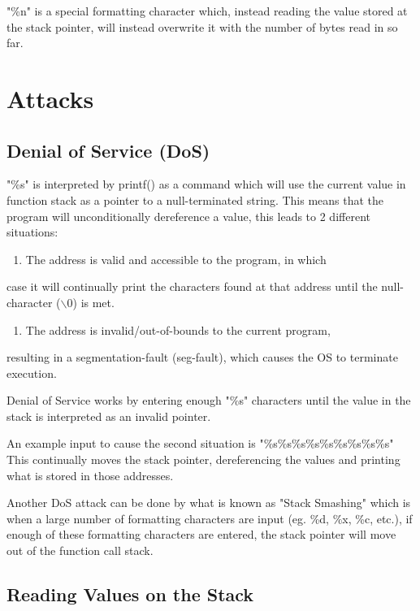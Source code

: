 \documentclass[11pt]{article}
\begin{document}
"\%n" is a special formatting character which, instead reading the
value stored at the stack pointer, will instead overwrite it with the
number of bytes read in so far.

\section{Attacks}
\label{sec:orgdff4b40}

\subsection{Denial of Service (DoS)}
\label{sec:org5581dcf}

"\%s" is interpreted by printf() as a command which will use the
current value in function stack as a pointer to a null-terminated
string. This means that the program will unconditionally dereference a
value, this leads to 2 different situations:

\begin{enumerate}
\item The address is valid and accessible to the program, in which
\end{enumerate}
case it will continually print the characters found at that address
until the null-character ($\backslash$0) is met.
\begin{enumerate}
\item The address is invalid/out-of-bounds to the current program,
\end{enumerate}
resulting in a segmentation-fault (seg-fault), which causes the OS to
terminate execution.

Denial of Service works by entering enough "\%s" characters until the
value in the stack is interpreted as an invalid pointer.

An example input to cause the second situation is "\%s\%s\%s\%s\%s\%s\%s\%s\%s"
This continually moves the stack pointer, dereferencing the values and
printing what is stored in those addresses.

Another DoS attack can be done by what is known as "Stack Smashing"
which is when a large number of formatting characters are input
(eg. \%d, \%x, \%c, etc.), if enough of these formatting characters are
entered, the stack pointer will move out of the function call stack.

\subsection{Reading Values on the Stack}
\label{sec:orgbbcfd68}
\end{document}
